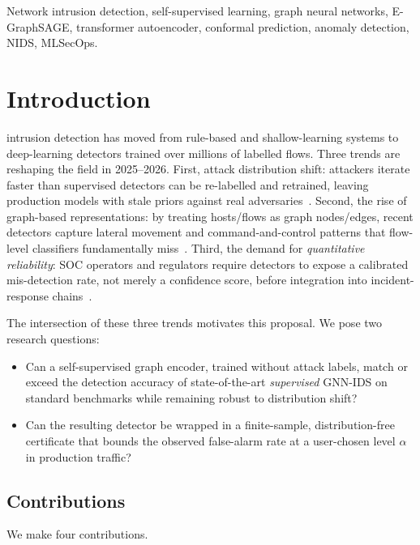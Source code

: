 \documentclass[journal,twoside]{IEEEtran}
\begin{document}
\begin{IEEEkeywords}
Network intrusion detection, self-supervised learning, graph neural networks,
E-GraphSAGE, transformer autoencoder, conformal prediction, anomaly detection,
NIDS, MLSecOps.
\end{IEEEkeywords}

\section{Introduction}
 intrusion detection has moved from rule-based and
shallow-learning systems to deep-learning detectors trained over millions of
labelled flows.  Three trends are reshaping the field in 2025--2026.
First, attack distribution shift: attackers iterate faster than supervised
detectors can be re-labelled and retrained, leaving production models with
stale priors against real adversaries~\cite{layeghy2023}. Second, the rise of
graph-based representations: by treating hosts/flows as graph nodes/edges,
recent detectors capture lateral movement and command-and-control patterns
that flow-level classifiers fundamentally miss~\cite{lo2022,nguyen2025graphids}.
Third, the demand for \emph{quantitative reliability}: SOC operators and
regulators require detectors to expose a calibrated mis-detection rate,
not merely a confidence score, before integration into incident-response
chains~\cite{nist_ai_rmf,owasp_llm_top10}.

The intersection of these three trends motivates this proposal.  We pose
two research questions:

\begin{itemize}[leftmargin=1.5em]
  \item[\textbf{RQ1.}] Can a self-supervised graph encoder, trained without
        attack labels, match or exceed the detection accuracy of
        state-of-the-art \emph{supervised} GNN-IDS on standard benchmarks
        while remaining robust to distribution shift?
  \item[\textbf{RQ2.}] Can the resulting detector be wrapped in a
        finite-sample, distribution-free certificate that bounds the
        observed false-alarm rate at a user-chosen level $\alpha$ in
        production traffic?
\end{itemize}

\subsection{Contributions}
We make four contributions.
\end{document}
